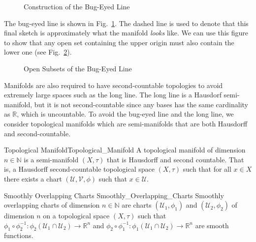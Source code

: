     \begin{figure}[H]
        \centering
        \captionsetup{type=figure}
        
        \caption{Construction of the Bug-Eyed Line}
        \label{fig:Bug_Eyed_Line}
    \end{figure}
    The bug-eyed line is shown in
    Fig.~\ref{fig:Bug_Eyed_Line}. The dashed line is used to denote that
    this final sketch is approximately what the manifold \textit{looks} like.
    We can use this figure to show that any open set containing the upper origin
    must also contain the lower one
    (see Fig.~\ref{fig:Open_Neighborhoods_of_Origins_in_Bug_Eyed_Line}).
    \begin{figure}[H]
        \centering
        \captionsetup{type=figure}
        
        \caption{Open Subsets of the Bug-Eyed Line}
        \label{fig:Open_Neighborhoods_of_Origins_in_Bug_Eyed_Line}
    \end{figure}
    Manifolds are also required to have second-countable topologies to avoid
    extremely large spaces such as the long line. The long line
    is a Hausdorf semi-manifold, but it is not second-countable since any bases
    has the same cardinality as $\mathbb{R}$, which is uncountable. To avoid the
    bug-eyed line and the long line, we consider topological manifolds which are
    semi-manifolds that are both Hausdorff and second-countable.
    \begin{fdefinition}{Topological Manifold}{Topological_Manifold}
        A topological manifold of dimension $n\in\mathbb{N}$ is a semi-manifold
        $(X,\tau)$ that is Hausdorff and second countable. That is, a
        Hausdorff second-countable topological space $(X,\tau)$ such that for
        all $x\in{X}$ there exists a chart $(\mathcal{U},\mathcal{V},\phi)$ such
        that $x\in\mathcal{U}$.
    \end{fdefinition}
    \begin{fdefinition}{Smoothly Overlapping Charts}
                       {Smoothly_Overlapping_Charts}
        Smoothly overlapping charts of dimension $n\in\mathbb{N}$ are
        charts $(\mathcal{U}_{1},\phi_{1})$ and
        $(\mathcal{U}_{2},\phi_{2})$ of dimension $n$ on a topological
        space $(X,\tau)$ such that
        $\phi_{1}\circ\phi_{2}^{\minus{1}}:%
         \phi_{2}(\mathcal{U}_{1}\cap\mathcal{U}_{2})%
         \rightarrow\mathbb{R}^{n}$ and
        $\phi_{2}\circ\phi_{1}^{\minus{1}}:%
         \phi_{1}(\mathcal{U}_{1}\cap\mathcal{U}_{2})%
         \rightarrow\mathbb{R}^{n}$ are smooth functions.
    \end{fdefinition}
